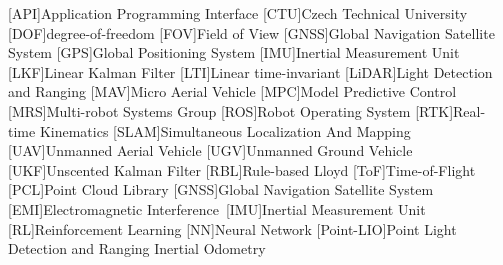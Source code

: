 
\begin{acronym}
  [API]{Application Programming Interface}
  [CTU]{Czech Technical University}
  [DOF]{degree-of-freedom}
  [FOV]{Field of View}
  [GNSS]{Global Navigation Satellite System}
  [GPS]{Global Positioning System}
  [IMU]{Inertial Measurement Unit}
  [LKF]{Linear Kalman Filter}
  [LTI]{Linear time-invariant}
  [LiDAR]{Light Detection and Ranging}
  [MAV]{Micro Aerial Vehicle}
  [MPC]{Model Predictive Control}
  [MRS]{Multi-robot Systems Group}
  [ROS]{Robot Operating System}
  [RTK]{Real-time Kinematics}
  [SLAM]{Simultaneous Localization And Mapping}
  [UAV]{Unmanned Aerial Vehicle}
  [UGV]{Unmanned Ground Vehicle}
  [UKF]{Unscented Kalman Filter}
  [RBL]{Rule-based Lloyd}
  [ToF]{Time-of-Flight}
  [PCL]{Point Cloud Library}
  [GNSS]{Global Navigation Satellite System}
  [EMI]{Electromagnetic Interference}\
  [IMU]{Inertial Measurement Unit}
  [RL]{Reinforcement Learning}
  [NN]{Neural Network}
  [Point-LIO]{Point Light Detection and Ranging Inertial Odometry}
\end{acronym}
